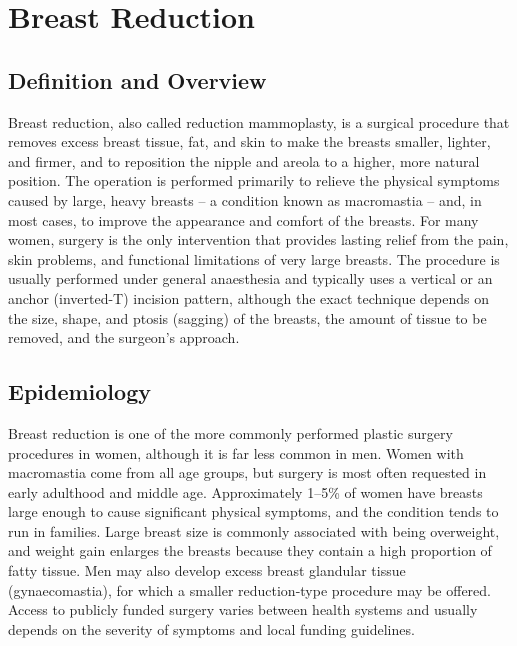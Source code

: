 \chapter{Breast Reduction}

\section*{Definition and Overview}
Breast reduction, also called reduction mammoplasty, is a surgical procedure that removes excess breast tissue, fat, and skin to make the breasts smaller, lighter, and firmer, and to reposition the nipple and areola to a higher, more natural position. The operation is performed primarily to relieve the physical symptoms caused by large, heavy breasts -- a condition known as macromastia -- and, in most cases, to improve the appearance and comfort of the breasts. For many women, surgery is the only intervention that provides lasting relief from the pain, skin problems, and functional limitations of very large breasts. The procedure is usually performed under general anaesthesia and typically uses a vertical or an anchor (inverted-T) incision pattern, although the exact technique depends on the size, shape, and ptosis (sagging) of the breasts, the amount of tissue to be removed, and the surgeon's approach.

\section*{Epidemiology}
Breast reduction is one of the more commonly performed plastic surgery procedures in women, although it is far less common in men. Women with macromastia come from all age groups, but surgery is most often requested in early adulthood and middle age. Approximately 1--5\% of women have breasts large enough to cause significant physical symptoms, and the condition tends to run in families. Large breast size is commonly associated with being overweight, and weight gain enlarges the breasts because they contain a high proportion of fatty tissue. Men may also develop excess breast glandular tissue (gynaecomastia), for which a smaller reduction-type procedure may be offered. Access to publicly funded surgery varies between health systems and usually depends on the severity of symptoms and local funding guidelines.

